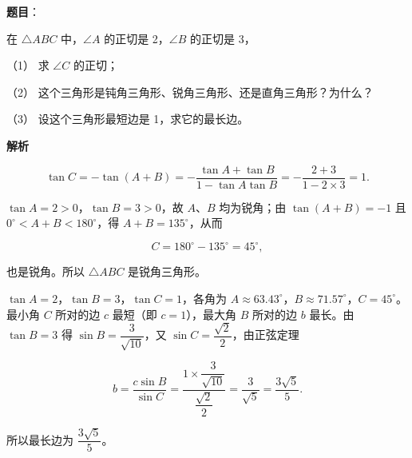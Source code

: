 \begin{answer}

\textbf{题目}：

在 $\triangle ABC$ 中，$\angle A$ 的正切是 2，$\angle B$ 的正切是 3，

（1） 求 $\angle C$ 的正切；

（2） 这个三角形是钝角三角形、锐角三角形、还是直角三角形？为什么？

（3） 设这个三角形最短边是 1，求它的最长边。

\textbf{解析}


\nopagebreak[4]
\[
\tan C=-\tan(A+B)
=-\frac{\tan A+\tan B}{1-\tan A\tan B}
=-\frac{2+3}{1-2\times3}=1.
\]


$\tan A=2>0$，$\tan B=3>0$，故 $A$、$B$ 均为锐角；由 $\tan(A+B)=-1$ 且 $0^{\circ}<A+B<180^{\circ}$，得 $A+B=135^{\circ}$，从而

\nopagebreak[4]
\[
C=180^{\circ}-135^{\circ}=45^{\circ},
\]

也是锐角。所以 $\triangle ABC$ 是锐角三角形。


$\tan A=2$，$\tan B=3$，$\tan C=1$，各角为 $A\approx63.43^{\circ}$，$B\approx71.57^{\circ}$，$C=45^{\circ}$。最小角 $C$ 所对的边 $c$ 最短（即 $c=1$），最大角 $B$ 所对的边 $b$ 最长。由 $\tan B=3$ 得 $\sin B=\dfrac{3}{\sqrt{10}}$，又 $\sin C=\dfrac{\sqrt{2}}{2}$，由正弦定理

\nopagebreak[4]
\[
b=\frac{c\sin B}{\sin C}
=\frac{1\times\dfrac{3}{\sqrt{10}}}{\dfrac{\sqrt{2}}{2}}
=\frac{3}{\sqrt{5}}
=\frac{3\sqrt{5}}{5}.
\]

所以最长边为 $\dfrac{3\sqrt{5}}{5}$。




\end{answer}